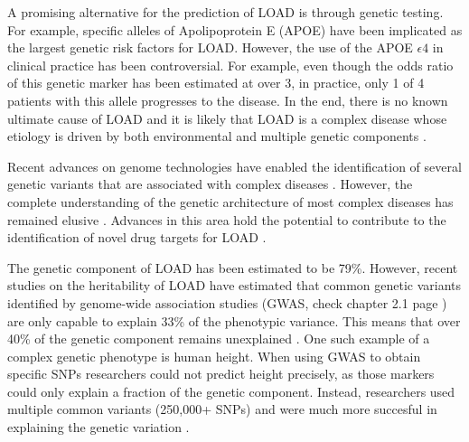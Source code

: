 A promising alternative for the prediction of LOAD is through genetic testing. For example, specific alleles of Apolipoprotein E (APOE) have been implicated as the largest genetic risk factors for LOAD. However, the use of the APOE $\epsilon4$ in clinical practice has been controversial. For example, even though the odds ratio of this genetic marker has been estimated at over 3, in practice, only 1 of 4 patients with this allele progresses to the disease. In the end, there is no known ultimate cause of LOAD and it is likely that LOAD is a complex disease whose etiology is driven by both environmental and multiple genetic components \cite{PANPALLIATES2016124}.

Recent advances on genome technologies have enabled the identification of several genetic variants that are associated with complex diseases \cite{Manolio2009} \cite{MacArthur2017}. However, the complete understanding of the genetic architecture of most complex diseases has remained elusive \cite{Ridge2013}. Advances in this area hold the potential to contribute to the identification of novel drug targets for LOAD \cite{Estrada2018}\cite{Freudenberg2018}.

The genetic component of LOAD has been estimated to be 79\%. However, recent studies on the heritability of LOAD have estimated that common genetic variants identified by genome-wide association studies (GWAS, check chapter 2.1 page \pageref{GWAS}) are only capable to explain 33\% of the phenotypic variance. This means that over 40\% of the genetic component remains unexplained \cite{Raghavan2017}. One such example of a complex genetic phenotype is human height. When using GWAS to obtain specific SNPs researchers could not predict height precisely, as those markers could only explain a fraction of the genetic component. Instead, researchers used multiple common variants (250,000+ SNPs) and were much more succesful in explaining the genetic variation \cite{Yang2010}.


